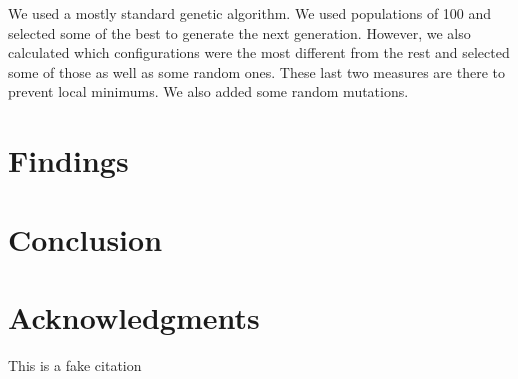 \documentclass[12pt]{article}
\begin{document}
We used a mostly standard genetic algorithm. We used populations of 100 and selected some of the best to generate the next generation. However, we also calculated which configurations were the most different from the rest and selected some of those as well as some random ones. These last two measures are there to prevent local minimums. We also added some random mutations.

\section{Findings}

\section{Conclusion}

\section{Acknowledgments}

This is a fake citation \cite{FakeArticle}

\newpage

 

\end{document}
